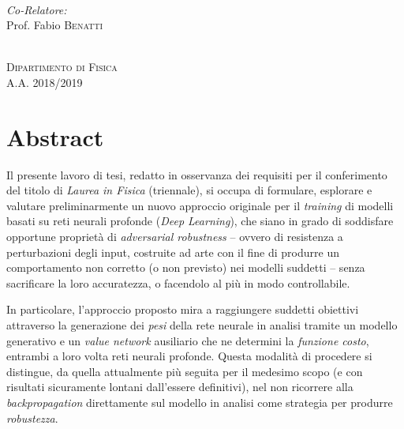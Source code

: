 \documentclass[a4paper, twoside]{article}
\begin{document}
\begin{titlepage}
\begin{minipage}{0.4\textwidth}
\begin{flushleft}
\emph{{\\ Co-Relatore:}} \\
{Prof. Fabio}  \textsc{{Benatti}}
\end{flushleft}
\end{minipage}\\[2cm]


\Large
\textsc{Dipartimento di Fisica\\
A.A. 2018/2019}
\vfill %
\end{titlepage}


\newcommand{\blankpage}{
	\newpage
	\thispagestyle{empty}
	\mbox{}
	\newpage}

\blankpage
\newpage
\renewcommand{\contentsname}{Indice}  %
\setcounter{section}{-1}			  %
\tableofcontents  %


\newpage
\section{Abstract}

Il presente lavoro di tesi, redatto in osservanza dei requisiti per il conferimento del titolo di \textit{Laurea in Fisica} (triennale), si occupa di formulare, esplorare e valutare preliminarmente un nuovo approccio originale per il \textit{training} di modelli basati su reti neurali profonde (\textit{Deep Learning}), che siano in grado di soddisfare opportune proprietà di \textit{adversarial robustness} -- ovvero di resistenza a perturbazioni degli input, costruite ad arte con il fine di produrre un comportamento non corretto (o non previsto) nei modelli suddetti -- senza sacrificare la loro accuratezza, o facendolo al più in modo controllabile.

In particolare, l'approccio proposto mira a raggiungere suddetti obiettivi attraverso la generazione dei \textit{pesi} della rete neurale in analisi tramite un modello generativo e un \textit{value network} ausiliario che ne determini la \textit{funzione costo}, entrambi a loro volta reti neurali profonde. Questa modalità di procedere si distingue, da quella attualmente più seguita per il medesimo scopo (e con risultati sicuramente lontani dall'essere definitivi), nel non ricorrere alla \textit{backpropagation} direttamente sul modello in analisi come strategia per produrre \textit{robustezza}.
\end{document}
